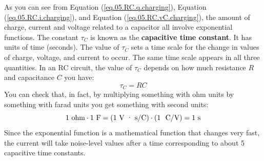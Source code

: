 As you can see from Equation (\ref{eq.05.RC.q.charging}), Equation (\ref{eq.05.RC.i.charging}), and Equation (\ref{eq.05.RC.vC.charging}), the amount of charge, current and voltage related to a capacitor all involve exponential functions. The constant $\tau_{C}$ is known as the \textbf{capacitive time constant}. It has units of time (seconds). The value of $\tau_{C}$ sets a time scale for the change in values of charge, voltage, and current to occur. The same time scale appears in all three quantities. In an RC circuit, the value of $\tau_{C}$ depends on how much resistance $R$ and capacitance $C$ you have:
\begin{equation}
    \tau_{C} = R C
    \label{eq.05.tauC}
\end{equation}
You can check that, in fact, by multiplying something with ohm units by something with farad units you get something with second units:
\begin{equation}
    1 \ \text{ohm} \cdot 1 \ \text{F} = \left(1 \ \text{V {\textperiodcentered} s/C}\right) \cdot \left(1 \ \text{ C/V}\right) = 1 \ \text{s}
\end{equation}
Since the exponential function is a mathematical function that changes very fast, the current will take noise-level values after a time corresponding to about 5 capacitive time constants.
%
